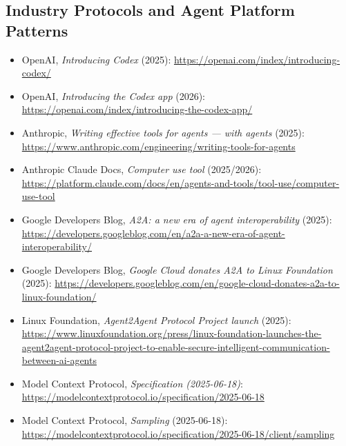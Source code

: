 \documentclass[11pt]{article}
\begin{document}
\hypertarget{industry-protocols-and-agent-platform-patterns}{%
\subsection{Industry Protocols and Agent Platform Patterns}\label{industry-protocols-and-agent-platform-patterns}}

\begin{itemize}
\tightlist
\item
  OpenAI, \emph{Introducing Codex} (2025):
  \url{https://openai.com/index/introducing-codex/}\\
\item
  OpenAI, \emph{Introducing the Codex app} (2026):
  \url{https://openai.com/index/introducing-the-codex-app/}\\
\item
  Anthropic, \emph{Writing effective tools for agents --- with agents}
  (2025):
  \url{https://www.anthropic.com/engineering/writing-tools-for-agents}\\
\item
  Anthropic Claude Docs, \emph{Computer use tool} (2025/2026):
  \url{https://platform.claude.com/docs/en/agents-and-tools/tool-use/computer-use-tool}\\
\item
  Google Developers Blog, \emph{A2A: a new era of agent
  interoperability} (2025):
  \url{https://developers.googleblog.com/en/a2a-a-new-era-of-agent-interoperability/}\\
\item
  Google Developers Blog, \emph{Google Cloud donates A2A to Linux
  Foundation} (2025):
  \url{https://developers.googleblog.com/en/google-cloud-donates-a2a-to-linux-foundation/}\\
\item
  Linux Foundation, \emph{Agent2Agent Protocol Project launch} (2025):
  \url{https://www.linuxfoundation.org/press/linux-foundation-launches-the-agent2agent-protocol-project-to-enable-secure-intelligent-communication-between-ai-agents}\\
\item
  Model Context Protocol, \emph{Specification (2025-06-18)}:
  \url{https://modelcontextprotocol.io/specification/2025-06-18}\\
\item
  Model Context Protocol, \emph{Sampling} (2025-06-18):
  \url{https://modelcontextprotocol.io/specification/2025-06-18/client/sampling}
\end{itemize}
\end{document}
